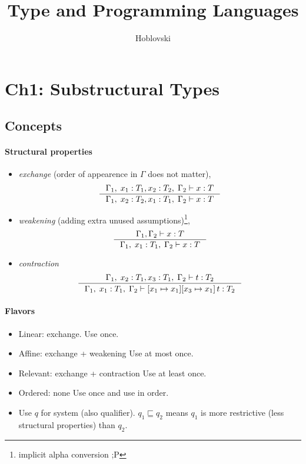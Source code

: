 \documentclass{article}
\title{Type and Programming Languages}
\author{Hoblovski}
\begin{document}
\maketitle
\tableofcontents

\section{Ch1: Substructural Types}
\subsection{Concepts}
\paragraph{Structural properties}
  \begin{itemize}
    \item \emph{exchange} (order of appearence in $\Gamma$ does not matter),
      \[
        \inference{
          \Gamma_1, \; x_1:T_1, x_2: T_2, \;\Gamma_2 \vdash x: T
        }{
          \Gamma_1, \; x_2:T_2, x_1: T_1, \;\Gamma_2 \vdash x: T
        }
      \]
    \item \emph{weakening} (adding extra unused assumptions)\footnote{implicit alpha conversion ;P},
      \[
        \inference{
          \Gamma_1, \Gamma_2 \vdash x:T
        }{
          \Gamma_1,\;x_1:T_1, \;\Gamma_2 \vdash x:T
        }
      \]
    \item \emph{contraction}
      \[
        \inference{
          \Gamma_1, \; x_2:T_1, x_3:T_1, \;\Gamma_2\vdash t:T_2
        }{
          \Gamma_1, \; x_1:T_1,\;\Gamma_2\vdash [x_1\mapsto x_1] [x_3\mapsto x_1]\,  t:T_2
        }
      \]
  \end{itemize}

\paragraph{Flavors}
  \begin{itemize}
    \item Linear: exchange.
      Use once.
    \item Affine: exchange + weakening
      Use at most once.
    \item Relevant: exchange + contraction
      Use at least once.
    \item Ordered: none
      Use once and use in order.
    \item Use $q$ for system (also qualifier).
      $q_1 \sqsubseteq q_2$ means $q_1$ is more restrictive (less structural properties) than $q_2$.
  \end{itemize}
\end{document}
